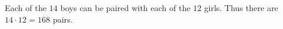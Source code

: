 Each of the $14$ boys can be paired with each of the $12$ girls. Thus there are $14\cdot12=\boxed{168}$ pairs.
